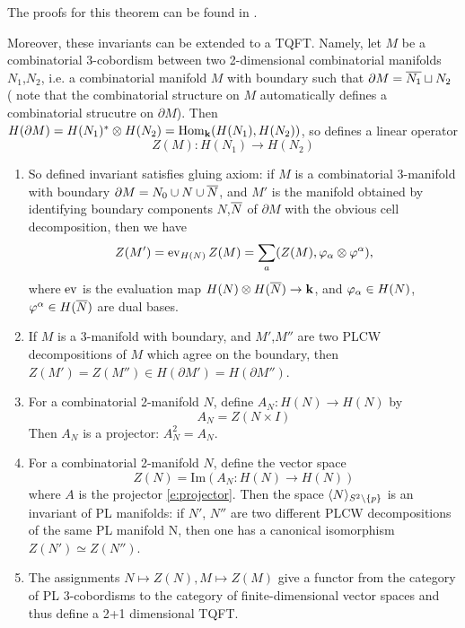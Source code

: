 The proofs for this theorem can be found in .

Moreover, these invariants can be extended to a TQFT. Namely, let $M$ be a combinatorial 3-cobordism between 
two 2-dimensional combinatorial manifolds $N_1$,$N_2$, i.e. a combinatorial manifold $M$ with boundary such
 that $\partial M = \overline{N_1} \sqcup N_2$ ( note that the combinatorial structure on $M$ automatically defines a 
 combinatorial strucutre on $\partial M$). Then $H(\partial M)=H(N_1)^* \otimes H(N_2)=\mathrm{Hom}_{\mathbf{k}} ( H(N_1),H(N_2))$, 
 so  defines a linear operator
\[
Z(M): H(N_1) \rightarrow H(N_2)
\]

\begin{theorem}\label{t:main2}
\par\noindent
	\begin{enumerate}
		\item So defined invariant satisfies gluing axiom: if $M$ is a combinatorial 3-manifold with boundary 
		$\partial M=N_0 \cup N \cup \overline{N}$, and $M'$ is the manifold obtained by identifying boundary components 
		$N$,$\overline{N}$ of $\partial M$ with the obvious cell decomposition, then we have
		\[
		Z(M')= \operatorname{ev}_{H(N)} Z(M) = \sum_a (Z(M),\varphi_\alpha \otimes \varphi^\alpha),
		\]
		where $\operatorname{ev}$ is the evaluation map $H(N)\otimes H(\overline{N}) \rightarrow  \mathbf{k} $, and $\varphi_\alpha \in H(N)$,
		 $\varphi^\alpha \in H(\overline{N})$ are dual bases.
		\item If $M$ is a 3-manifold with boundary, and $M'$,$M''$ are two PLCW decompositions of $M$ which 
		agree on the boundary, then $Z(M')=Z(M'') \in H( \partial M')=H(\partial M'')$.
		\item For a combinatorial 2-manifold $N$, define $A_N:H(N) \rightarrow H(N)$ by
		\begin{equation}\label{e:projector}
			A_N=Z(N \times I)
		\end{equation}
		Then $A_N$ is a projector: $A^2_N = A_N$.
		\item For a combinatorial 2-manifold $N$, define the vector space
		\begin{equation}
			Z(N)= \mathrm{Im}(A_N:H(N) \rightarrow H(N))
		\end{equation}
		where $A$ is the projector \eqref{e:projector}. Then the space $\langle N\rangle_{S^2\setminus\{p\}}$ is an invariant of PL 
		manifolds: if $N'$, $N''$ are two different PLCW decompositions of the same PL manifold N, then one has a
		 canonical isomorphism $Z(N') \simeq Z(N'')$.
		\item The assignments $N \mapsto Z(N), M \mapsto Z(M)$ give a functor from the category of PL 3-cobordisms
		 to the category of finite-dimensional vector spaces and thus define a 2+1 dimensional TQFT.
		\end{enumerate}
\end{theorem}

